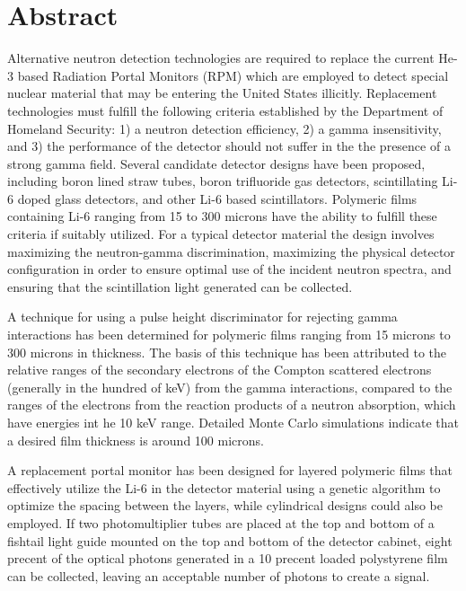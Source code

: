 \chapter*{Abstract}
\label{chap:abstract}
Alternative neutron detection technologies are required to replace the current He-3 based Radiation Portal Monitors (RPM) which are employed to detect special nuclear material that may be entering the United States illicitly.
Replacement technologies must fulfill the following criteria established by the Department of Homeland Security: 1) a neutron detection efficiency, 2) a gamma insensitivity, and 3) the performance of the detector should not suffer in the the presence of a strong gamma field.
Several candidate detector designs have been proposed, including boron lined straw tubes, boron trifluoride gas detectors, scintillating Li-6 doped glass detectors, and other Li-6 based scintillators.
Polymeric films containing Li-6 ranging from 15 to 300 microns have the ability to fulfill these criteria if suitably utilized.
For a typical detector material the design involves maximizing the neutron-gamma discrimination, maximizing the physical detector configuration in order to ensure optimal use of the incident neutron spectra, and ensuring that the scintillation light generated can be collected.

A technique for using a pulse height discriminator for rejecting gamma interactions has been determined for polymeric films  ranging from 15 microns to 300 microns in thickness.
The basis of this technique has been attributed to the relative ranges of the secondary electrons of the Compton scattered electrons (generally in the hundred of keV) from the gamma interactions, compared to the ranges of the electrons from the reaction products of a neutron absorption, which have energies int he 10 keV range.
Detailed Monte Carlo simulations indicate that a desired film thickness is around 100 microns.

A replacement portal monitor has been designed for layered polymeric films that effectively utilize the Li-6 in the detector material using a genetic algorithm to optimize the spacing between the layers, while cylindrical designs could also be employed.
If two photomultiplier tubes are placed at the top and bottom of a fishtail light guide mounted on the top and bottom of the detector cabinet, eight precent of the optical photons generated in a 10 precent loaded polystyrene film can be collected, leaving an acceptable number of photons to create a signal.
